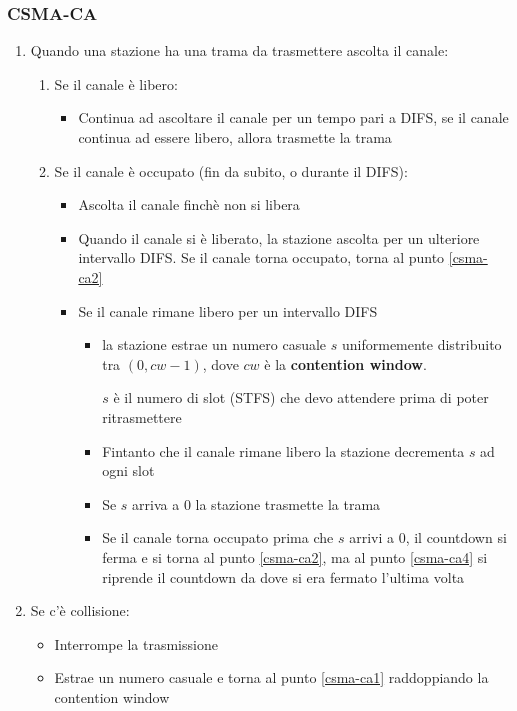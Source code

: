 \documentclass[a4paper]{article}
\begin{document}
\subsubsection{CSMA-CA}
\begin{enumerate}
  \item \label{csma-ca1} Quando una stazione ha una trama da trasmettere ascolta il canale:
    \begin{enumerate}
      \item Se il canale è libero:
        \begin{itemize}
          \item Continua ad ascoltare il canale per un tempo pari a DIFS,
            se il canale continua ad essere libero, allora trasmette la trama
        \end{itemize}

      \item \label{csma-ca2} Se il canale è occupato (fin da subito, o durante il DIFS):
        \begin{itemize}
          \item Ascolta il canale finchè non si libera
          \item Quando il canale si è liberato, la stazione ascolta per
            un ulteriore intervallo DIFS. Se il canale torna occupato,
            torna al punto \ref{csma-ca2}
          \item \label{csma-ca4} Se il canale rimane libero per un intervallo DIFS
            \begin{itemize}
              \item 
                la stazione
                estrae un numero casuale \( s \) uniformemente distribuito tra \( (0,cw-1) \),
                dove \( cw \) è la \textbf{contention window}.

                \( s \) è il numero di slot (STFS) che devo attendere prima di poter
                ritrasmettere

              \item Fintanto che il canale rimane libero la stazione decrementa
                \( s \) ad ogni slot

              \item Se \( s \) arriva a 0 la stazione trasmette la trama
              \item Se il canale torna occupato prima che \( s \) arrivi a 0,
                il countdown si ferma e si torna al punto \ref{csma-ca2},
                ma al punto \ref{csma-ca4} si riprende il countdown da dove si era
                fermato l'ultima volta
            \end{itemize}
        \end{itemize}
    \end{enumerate}

  \item Se c'è collisione:
    \begin{itemize}
      \item Interrompe la trasmissione
      \item Estrae un numero casuale e torna al punto \ref{csma-ca1} raddoppiando
        la contention window
    \end{itemize}
\end{enumerate}
\end{document}
